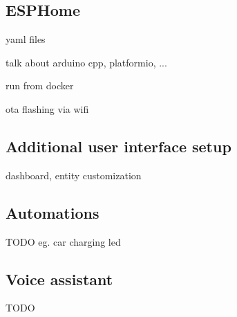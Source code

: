 \subsection{ESPHome}

yaml files

talk about arduino cpp, platformio, ...

run from docker

ota flashing via wifi

\subsection{Additional user interface setup}

dashboard, entity customization

\subsection{Automations}

TODO eg. car charging led

\subsection{Voice assistant}

TODO
